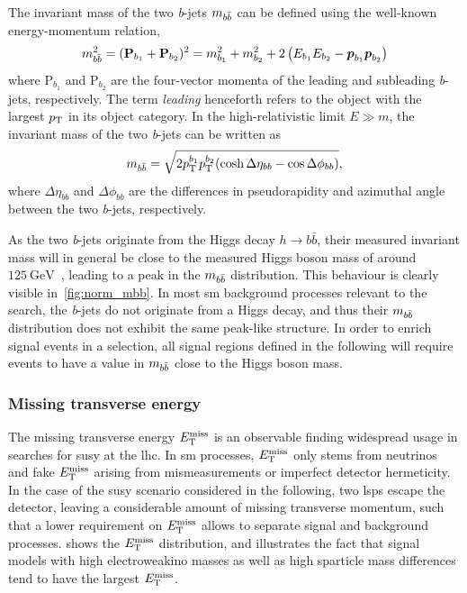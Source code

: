 The invariant mass of the two \textit{b}-jets $m_{b\bar{b}}$ can be defined using the well-known energy-momentum relation, 
\begin{equation}
	m_{b\bar{b}}^2 = (\boldsymbol{\mathrm{P}}_{b_1}+\boldsymbol{\mathrm{P}}_{b_2})^2 = m^2_{b_1} + m^2_{b_2} + 2\left(E_{b_1}E_{b_2} - \boldsymbol{p}_{b_1}\boldsymbol{p}_{b_2}\right)
\end{equation}
where $\boldsymbol{\mathrm{P}}_{b_1}$ and $\boldsymbol{\mathrm{P}}_{b_2}$ are the four-vector momenta of the leading and subleading \textit{b}-jets, respectively. The term \textit{leading} henceforth refers to the object with the largest $p_{\textrm{T}}$ in its object category. In the high-relativistic limit $E \gg m$, the invariant mass of the two \textit{b}-jets can be written as
\begin{equation}
	m_{b\bar{b}} = \sqrt{2p_{\textrm{T}}^{b_1}p_{\textrm{T}}^{b_2}(\cosh\Delta\eta_{bb} - \cos\Delta\phi_{bb})},
\end{equation}
where $\Delta\eta_{bb}$ and $\Delta\phi_{bb}$ are the differences in pseudorapidity and azimuthal angle between the two \textit{b}-jets, respectively.

As the two \textit{b}-jets originate from the Higgs decay $h\rightarrow b\bar{b}$, their measured invariant mass will in general be close to the measured Higgs boson mass of around $\SI{125}{\GeV}$~\cite{pdg2020}, leading to a peak in the $m_{b\bar{b}}$ distribution. This behaviour is clearly visible in~\cref{fig:norm_mbb}. In most \gls{sm} background processes relevant to the search, the \textit{b}-jets do not originate from a Higgs decay, and thus their $m_{b\bar{b}}$ distribution does not exhibit the same peak-like structure. In order to enrich signal events in a selection, all signal regions defined in the following will require events to have a value in $m_{b\bar{b}}$ close to the Higgs boson mass.

\subsubsection{Missing transverse energy}

The missing transverse energy $E_{\textrm{T}}^{\textrm{miss}}$ is an observable finding widespread usage in searches for \gls{susy} at the \gls{lhc}. In \gls{sm} processes, $E_{\textrm{T}}^{\textrm{miss}}$ only stems from neutrinos and fake $E_{\textrm{T}}^{\textrm{miss}}$ arising \eg from mismeasurements or imperfect detector hermeticity. In the case of the \gls{susy} scenario considered in the following, two \glspl{lsp} escape the detector, leaving a considerable amount of missing transverse momentum, such that a lower requirement on $E_{\textrm{T}}^{\textrm{miss}}$ allows to separate signal and background processes.  shows the $E_{\textrm{T}}^{\textrm{miss}}$ distribution, and illustrates the fact that signal models with high electroweakino masses as well as high sparticle mass differences tend to have the largest $E_{\textrm{T}}^{\textrm{miss}}$.  


